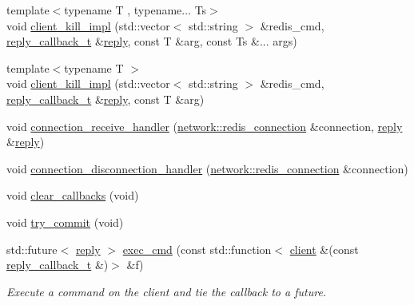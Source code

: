 \begin{DoxyCompactItemize}
\item 
{\footnotesize template$<$typename T , typename... Ts$>$ }\\void \hyperlink{classcpp__redis_1_1client_a1f895140bce1499fabc1fb2fb4d6600d}{client\+\_\+kill\+\_\+impl} (std\+::vector$<$ std\+::string $>$ \&redis\+\_\+cmd, \hyperlink{classcpp__redis_1_1client_a061a1140d36d2eaeda82b09a0bb3f9f2}{reply\+\_\+callback\+\_\+t} \&\hyperlink{classcpp__redis_1_1reply}{reply}, const T \&arg, const Ts \&... args)
\item 
{\footnotesize template$<$typename T $>$ }\\void \hyperlink{classcpp__redis_1_1client_a1d40b08734a2ed59a5b09739c5f32fae}{client\+\_\+kill\+\_\+impl} (std\+::vector$<$ std\+::string $>$ \&redis\+\_\+cmd, \hyperlink{classcpp__redis_1_1client_a061a1140d36d2eaeda82b09a0bb3f9f2}{reply\+\_\+callback\+\_\+t} \&\hyperlink{classcpp__redis_1_1reply}{reply}, const T \&arg)
\item 
void \hyperlink{classcpp__redis_1_1client_ac9e2229d4d20db863681447e24046aef}{connection\+\_\+receive\+\_\+handler} (\hyperlink{classcpp__redis_1_1network_1_1redis__connection}{network\+::redis\+\_\+connection} \&connection, \hyperlink{classcpp__redis_1_1reply}{reply} \&\hyperlink{classcpp__redis_1_1reply}{reply})
\item 
void \hyperlink{classcpp__redis_1_1client_aaa3442a618a8a0029aebb0595efaf13d}{connection\+\_\+disconnection\+\_\+handler} (\hyperlink{classcpp__redis_1_1network_1_1redis__connection}{network\+::redis\+\_\+connection} \&connection)
\item 
void \hyperlink{classcpp__redis_1_1client_a64585796534941c024eaaa72f93d8977}{clear\+\_\+callbacks} (void)
\item 
void \hyperlink{classcpp__redis_1_1client_a6c7aff2567b5ca7f527faa4f2ebca405}{try\+\_\+commit} (void)
\item 
std\+::future$<$ \hyperlink{classcpp__redis_1_1reply}{reply} $>$ \hyperlink{classcpp__redis_1_1client_a3097bc84df061096c553cb5b03d85f0a}{exec\+\_\+cmd} (const std\+::function$<$ \hyperlink{classcpp__redis_1_1client}{client} \&(const \hyperlink{classcpp__redis_1_1client_a061a1140d36d2eaeda82b09a0bb3f9f2}{reply\+\_\+callback\+\_\+t} \&)$>$ \&f)
\begin{DoxyCompactList}\small\item\em Execute a command on the client and tie the callback to a future. \end{DoxyCompactList}\end{DoxyCompactItemize}
